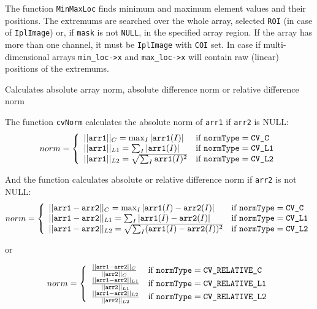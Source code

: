 The function \texttt{MinMaxLoc} finds minimum and maximum element values
and their positions. The extremums are searched over the whole array,
selected \texttt{ROI} (in case of \texttt{IplImage}) or, if \texttt{mask}
is not \texttt{NULL}, in the specified array region. If the array has
more than one channel, it must be \texttt{IplImage} with \texttt{COI}
set. In case if multi-dimensional arrays \texttt{min\_loc->x} and \texttt{max\_loc->x}
will contain raw (linear) positions of the extremums.


Calculates absolute array norm, absolute difference norm or relative difference norm


\begin{description}
\end{description}

The function \texttt{cvNorm} calculates the absolute norm of \texttt{arr1} if \texttt{arr2} is NULL:
\[
norm = \left\{ \begin{array}{l l} ||\texttt{arr1}||_C    = \max_I |\texttt{arr1}(I)| & \mbox{if $\texttt{normType} = \texttt{CV\_C}$}\\ ||\texttt{arr1}||_{L1} = \sum_I |\texttt{arr1}(I)| & \mbox{if $\texttt{normType} = \texttt{CV\_L1}$}\\ ||\texttt{arr1}||_{L2} = \sqrt{\sum_I \texttt{arr1}(I)^2} & \mbox{if $\texttt{normType} = \texttt{CV\_L2}$}\\ \end{array} \right.
\]

And the function calculates absolute or relative difference norm if \texttt{arr2} is not NULL:
\[
norm = \left\{ \begin{array}{l l} ||\texttt{arr1}-\texttt{arr2}||_C    = \max_I |\texttt{arr1}(I) - \texttt{arr2}(I)| & \mbox{if $\texttt{normType} = \texttt{CV\_C}$}\\ ||\texttt{arr1}-\texttt{arr2}||_{L1} = \sum_I |\texttt{arr1}(I) - \texttt{arr2}(I)| & \mbox{if $\texttt{normType} = \texttt{CV\_L1}$}\\ ||\texttt{arr1}-\texttt{arr2}||_{L2} = \sqrt{\sum_I (\texttt{arr1}(I) - \texttt{arr2}(I))^2} & \mbox{if $\texttt{normType} = \texttt{CV\_L2}$}\\ \end{array} \right.
\]

or

\[
norm = \left\{ \begin{array}{l l} \frac{||\texttt{arr1}-\texttt{arr2}||_C    }{||\texttt{arr2}||_C   } & \mbox{if $\texttt{normType} = \texttt{CV\_RELATIVE\_C}$}\\ \frac{||\texttt{arr1}-\texttt{arr2}||_{L1} }{||\texttt{arr2}||_{L1}} & \mbox{if $\texttt{normType} = \texttt{CV\_RELATIVE\_L1}$}\\ \frac{||\texttt{arr1}-\texttt{arr2}||_{L2} }{||\texttt{arr2}||_{L2}} & \mbox{if $\texttt{normType} = \texttt{CV\_RELATIVE\_L2}$}\\ \end{array} \right.
\]

